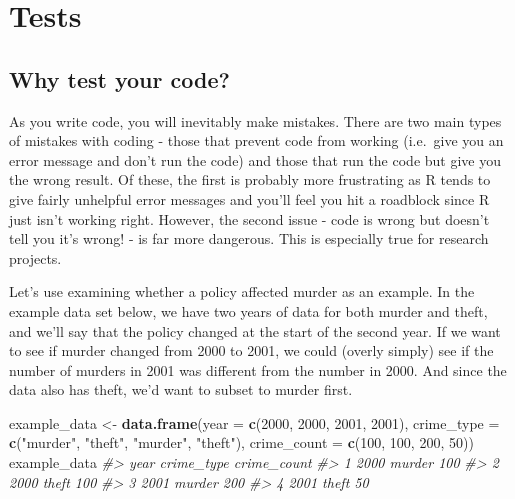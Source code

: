 \documentclass[
  12pt,
]{book}
\newenvironment{Shaded}{\begin{snugshade}}{\end{snugshade}}
\newcommand{\CommentTok}[1]{\textcolor[rgb]{0.37,0.37,0.37}{\textit{#1}}}
\newcommand{\DataTypeTok}[1]{\textcolor[rgb]{0.27,0.27,0.27}{#1}}
\newcommand{\DecValTok}[1]{\textcolor[rgb]{0.06,0.06,0.06}{#1}}
\newcommand{\KeywordTok}[1]{\textcolor[rgb]{0.27,0.27,0.27}{\textbf{#1}}}
\newcommand{\NormalTok}[1]{#1}
\newcommand{\StringTok}[1]{\textcolor[rgb]{0.5,0.5,0.5}{#1}}
\begin{document}
\hypertarget{tests}{%
\chapter{Tests}\label{tests}}

\hypertarget{why-test-your-code}{%
\section{Why test your code?}\label{why-test-your-code}}

As you write code, you will inevitably make mistakes. There are two main types of mistakes with coding - those that prevent code from working (i.e.~give you an error message and don't run the code) and those that run the code but give you the wrong result. Of these, the first is probably more frustrating as R tends to give fairly unhelpful error messages and you'll feel you hit a roadblock since R just isn't working right. However, the second issue - code is wrong but doesn't tell you it's wrong! - is far more dangerous. This is especially true for research projects.

Let's use examining whether a policy affected murder as an example. In the example data set below, we have two years of data for both murder and theft, and we'll say that the policy changed at the start of the second year. If we want to see if murder changed from 2000 to 2001, we could (overly simply) see if the number of murders in 2001 was different from the number in 2000. And since the data also has theft, we'd want to subset to murder first.

\begin{Shaded}
\begin{Highlighting}[]
\NormalTok{example\_data \textless{}{-}}\StringTok{ }\KeywordTok{data.frame}\NormalTok{(}\DataTypeTok{year =} \KeywordTok{c}\NormalTok{(}\DecValTok{2000}\NormalTok{, }\DecValTok{2000}\NormalTok{, }\DecValTok{2001}\NormalTok{, }\DecValTok{2001}\NormalTok{),}
                           \DataTypeTok{crime\_type =} \KeywordTok{c}\NormalTok{(}\StringTok{"murder"}\NormalTok{, }\StringTok{"theft"}\NormalTok{, }\StringTok{"murder"}\NormalTok{, }\StringTok{"theft"}\NormalTok{),}
                           \DataTypeTok{crime\_count =} \KeywordTok{c}\NormalTok{(}\DecValTok{100}\NormalTok{, }\DecValTok{100}\NormalTok{, }\DecValTok{200}\NormalTok{, }\DecValTok{50}\NormalTok{))}
\NormalTok{example\_data}
\CommentTok{\#\textgreater{}   year crime\_type crime\_count}
\CommentTok{\#\textgreater{} 1 2000     murder         100}
\CommentTok{\#\textgreater{} 2 2000      theft         100}
\CommentTok{\#\textgreater{} 3 2001     murder         200}
\CommentTok{\#\textgreater{} 4 2001      theft          50}
\end{Highlighting}
\end{Shaded}
\end{document}
